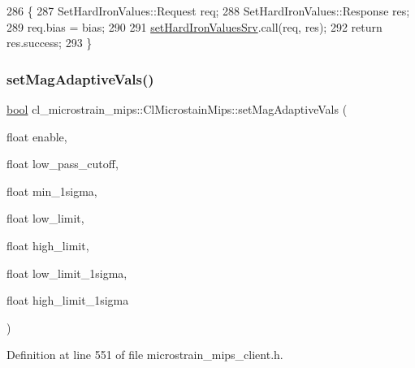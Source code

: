 \begin{DoxyCode}
286     \{
287         SetHardIronValues::Request req;
288         SetHardIronValues::Response res;
289         req.bias = bias;
290 
291         \hyperlink{classcl__microstrain__mips_1_1ClMicrostainMips_abab500a095515c133d5edfea23736fad}{setHardIronValuesSrv}.call(req, res);
292         \textcolor{keywordflow}{return} res.success;
293     \}
\end{DoxyCode}
\mbox{\label{classcl__microstrain__mips_1_1ClMicrostainMips_ad28163dc7afc33064b337f6a76b99389}} 
\subsubsection{\texorpdfstring{set\+Mag\+Adaptive\+Vals()}{setMagAdaptiveVals()}}
{\footnotesize\ttfamily \hyperlink{classbool}{bool} cl\+\_\+microstrain\+\_\+mips\+::\+Cl\+Microstain\+Mips\+::set\+Mag\+Adaptive\+Vals (\begin{DoxyParamCaption}\item[{float}]{enable,  }\item[{float}]{low\+\_\+pass\+\_\+cutoff,  }\item[{float}]{min\+\_\+1sigma,  }\item[{float}]{low\+\_\+limit,  }\item[{float}]{high\+\_\+limit,  }\item[{float}]{low\+\_\+limit\+\_\+1sigma,  }\item[{float}]{high\+\_\+limit\+\_\+1sigma }\end{DoxyParamCaption})\hspace{0.3cm}{\ttfamily [inline]}}



Definition at line 551 of file microstrain\+\_\+mips\+\_\+client.\+h.


